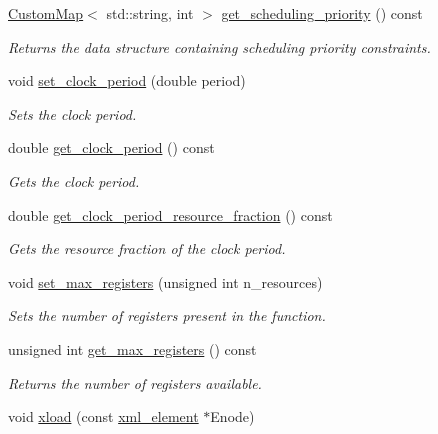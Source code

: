 \begin{DoxyCompactItemize}
\hyperlink{custom__map_8hpp_a18ca01763abbe3e5623223bfe5aaac6b}{Custom\+Map}$<$ std\+::string, int $>$ \hyperlink{classHLS__constraints_af14fb287ca33eee91e03223daa631cc3}{get\+\_\+scheduling\+\_\+priority} () const
\begin{DoxyCompactList}\small\item\em Returns the data structure containing scheduling priority constraints. \end{DoxyCompactList}\item 
void \hyperlink{classHLS__constraints_a709ff2e7748684517916921c94a7175f}{set\+\_\+clock\+\_\+period} (double period)
\begin{DoxyCompactList}\small\item\em Sets the clock period. \end{DoxyCompactList}\item 
double \hyperlink{classHLS__constraints_af50660880ee956518894057845c5c45d}{get\+\_\+clock\+\_\+period} () const
\begin{DoxyCompactList}\small\item\em Gets the clock period. \end{DoxyCompactList}\item 
double \hyperlink{classHLS__constraints_a4daca2ffc0b08c77e83d16b3c45a0cdf}{get\+\_\+clock\+\_\+period\+\_\+resource\+\_\+fraction} () const
\begin{DoxyCompactList}\small\item\em Gets the resource fraction of the clock period. \end{DoxyCompactList}\item 
void \hyperlink{classHLS__constraints_ab2df34ff3335a38b047895ca9d303583}{set\+\_\+max\+\_\+registers} (unsigned int n\+\_\+resources)
\begin{DoxyCompactList}\small\item\em Sets the number of registers present in the function. \end{DoxyCompactList}\item 
unsigned int \hyperlink{classHLS__constraints_a4378dfa86b2203804067e93694ebaa6a}{get\+\_\+max\+\_\+registers} () const
\begin{DoxyCompactList}\small\item\em Returns the number of registers available. \end{DoxyCompactList}\item 
void \hyperlink{classHLS__constraints_ae9f1030321791e339e7ced72f1d00cb1}{xload} (const \hyperlink{classxml__element}{xml\+\_\+element} $\ast$Enode)

\end{DoxyCompactItemize}
